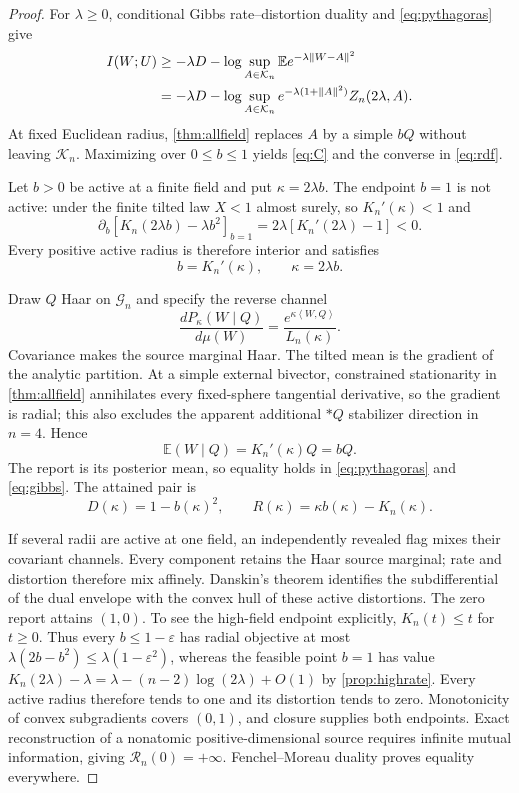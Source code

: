 \documentclass[11pt,a4paper]{article}
\newcommand{\G}{\mathcal G}
\newcommand{\K}{\mathcal K}
\newcommand{\RDF}{\mathcal R}
\newcommand{\E}{\mathbb E}
\newcommand{\ip}[2]{\left\langle #1,#2\right\rangle}
\begin{document}
\begin{proof}
For $\lambda\ge0$, conditional Gibbs rate--distortion duality
\cite{Berger1971,Csiszar1974} and \cref{eq:pythagoras} give
\begin{align}
 I(W;U)
 &\ge-\lambda D-\log\sup_{A\in\K_n}
 \E e^{-\lambda\|W-A\|^2}\notag\\
 &=-\lambda D-\log\sup_{A\in\K_n}
 e^{-\lambda(1+\|A\|^2)}Z_n(2\lambda,A).\label{eq:gibbs}
\end{align}
At fixed Euclidean radius, \cref{thm:allfield} replaces $A$ by a simple $bQ$ without leaving $\K_n$.  Maximizing over $0\le b\le1$ yields \cref{eq:C} and the converse in \cref{eq:rdf}.

Let $b>0$ be active at a finite field and put $\kappa=2\lambda b$.  The endpoint $b=1$ is not active: under the finite tilted law $X<1$ almost surely, so $K_n'(\kappa)<1$ and
\[
 \partial_b[K_n(2\lambda b)-\lambda b^2]_{b=1}
 =2\lambda[K_n'(2\lambda)-1]<0.
\]
Every positive active radius is therefore interior and satisfies
\begin{equation}\label{eq:selfconsistency}
 b=K_n'(\kappa),\qquad \kappa=2\lambda b.
\end{equation}

Draw $Q$ Haar on $\G_n$ and specify the reverse channel
\begin{equation}\label{eq:channel}
 \frac{dP_\kappa(W\mid Q)}{d\mu(W)}
 =\frac{e^{\kappa\ip WQ}}{L_n(\kappa)}.
\end{equation}
Covariance makes the source marginal Haar.  The tilted mean is the gradient of the analytic partition.  At a simple external bivector, constrained stationarity in \cref{thm:allfield} annihilates every fixed-sphere tangential derivative, so the gradient is radial; this also excludes the apparent additional $*Q$ stabilizer direction in $n=4$.  Hence
\[
 \E(W\mid Q)=K_n'(\kappa)Q=bQ.
\]
The report is its posterior mean, so equality holds in \cref{eq:pythagoras} and \cref{eq:gibbs}.  The attained pair is
\begin{equation}\label{eq:parametric}
 D(\kappa)=1-b(\kappa)^2,\qquad
 R(\kappa)=\kappa b(\kappa)-K_n(\kappa).
\end{equation}

If several radii are active at one field, an independently revealed flag mixes their covariant channels.  Every component retains the Haar source marginal; rate and distortion therefore mix affinely.  Danskin's theorem identifies the subdifferential of the dual envelope with the convex hull of these active distortions.  The zero report attains $(1,0)$.  To see the high-field endpoint explicitly, $K_n(t)\le t$ for $t\ge0$.  Thus every $b\le1-\varepsilon$ has radial objective at most $\lambda(2b-b^2)\le\lambda(1-\varepsilon^2)$, whereas the feasible point $b=1$ has value $K_n(2\lambda)-\lambda=\lambda-(n-2)\log(2\lambda)+O(1)$ by \cref{prop:highrate}.  Every active radius therefore tends to one and its distortion tends to zero.  Monotonicity of convex subgradients covers $(0,1)$, and closure supplies both endpoints.  Exact reconstruction of a nonatomic positive-dimensional source requires infinite mutual information, giving $\RDF_n(0)=+\infty$.  Fenchel--Moreau duality proves equality everywhere.
\end{proof}
\end{document}
